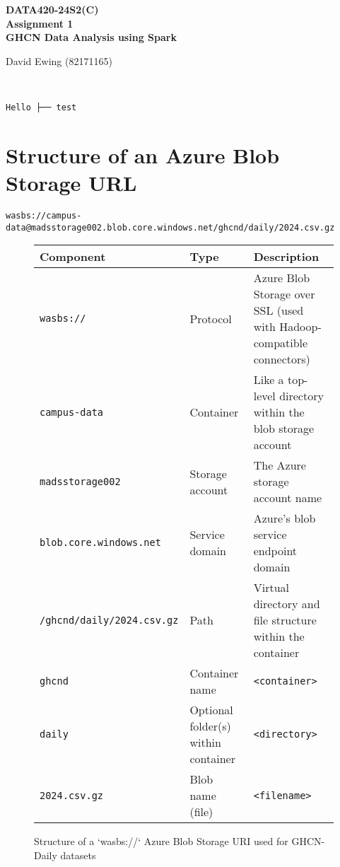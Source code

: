 \documentclass[11pt]{article}
\newcommand{\custommaketitle}{
    \begin{center}
        \vspace*{3cm}
        
        {\Large\textsf{\textbf{DATA420-24S2(C)}}}\\
        \vspace{0.3cm} 
        {\large\textsf{\textbf{Assignment 1}}}\\
        \vspace{5cm}
        {\Large\textsf{\textbf{GHCN Data Analysis using Spark}}}\\
        \vfill
        {\large David Ewing (82171165)\par}
        \vspace{0.3cm}
        \DTMsetdatestyle{yyyymmdd}
        {\large\textsf{ \DTMnow}}\\
        
        \vspace{3cm}
    \end{center}
    \thispagestyle{empty}
}
\begin{document}
\renewcommand{\familydefault}{\sfdefault}
\custommaketitle

\renewcommand{\familydefault}{\sfdefault}
\newpage 

\setmonofont{Consolas}
\begin{verbatim}
Hello ├── test
\end{verbatim}
\setmonofont{Courier New}



\section*{Structure of an Azure Blob Storage URL}
\sloppy
\noindent\texttt{wasbs://campus-data@madsstorage002.blob.core.windows.net/ghcnd/daily/2024.csv.gz}
\bigskip

\noindent
\begin{figure}[htbp]
    \centering
\begin{tabular}{@{}L{0.35\textwidth} L{0.12\textwidth} L{0.50\textwidth}@{}}
\toprule
\textbf{Component} & \textbf{Type} & \textbf{Description} \\
\midrule
\texttt{wasbs://} & Protocol & Azure Blob Storage over SSL (used with Hadoop-compatible connectors)\par \\
\texttt{campus-data} & Container & Like a top-level directory within the blob storage account\par \\
\texttt{madsstorage002} & Storage account\par & The Azure storage account name \\
\texttt{blob.core.windows.net} & Service domain\par & Azure’s blob service endpoint domain \\
\texttt{/ghcnd/daily/2024.csv.gz} & Path & Virtual directory and file structure within the container\par \\
\texttt{ghcnd} & Container name\par & \texttt{<container>} \\
\texttt{daily} & Optional folder(s) within container\par & \texttt{<directory>}\\
\texttt{2024.csv.gz} & Blob name (file) &  \texttt{<filename>} \\
\bottomrule
\end{tabular}
\caption{Structure of a `wasbs://` Azure Blob Storage URI used for GHCN-Daily datasets}
\label{fig:wasbs-uri-structure}
\end{figure}
\bigskip
\end{document}

